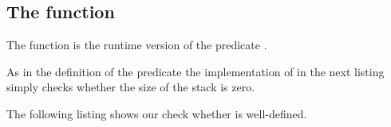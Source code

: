 
\subsection{The function \stackempty}

The function \stackempty is the runtime version of the predicate .



As in the definition of the predicate \StackEmpty the implementation of
\stackempty in the next listing simply checks whether the
size of the stack is zero.



The following listing shows our check whether \stackempty is well-defined.



